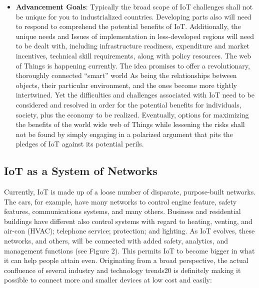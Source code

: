\begin{itemize}
 \item \textbf{Advancement Goals}: Typically the broad scope of IoT challenges shall not be unique for you to industrialized countries. Developing parts also will need to respond to comprehend the potential benefits of IoT. Additionally, the unique needs and
 Issues of implementation in less-developed regions will need to be dealt with, including infrastructure readiness, expenditure and market incentives, technical skill requirements, along with policy resources.
The web of Things is happening currently. The idea promises to offer a revolutionary, thoroughly connected “smart” world As being the relationships between objects, their particular environment, and the ones become more tightly intertwined. Yet the difficulties and challenges associated with IoT need to be considered and resolved in order for the potential benefits for individuals, society, plus the economy to be realized. Eventually, options for maximizing the benefits of the world wide web of Things while lessening the risks shall not be found by simply engaging in a polarized argument that pits the pledges of IoT against its potential perils.

\end{itemize}

\subsection{IoT as a System of Networks}
Currently, IoT is made up of a loose number of disparate, purpose-built networks. The cars, for example, have many networks to control engine feature, safety features, communications systems, and many others. Business and residential buildings have different also control systems with regard to heating, venting, and air-con (HVAC); telephone service; protection; and lighting. As IoT evolves, these networks, and others, will be connected with added safety, analytics, and management functions (see Figure 2). This permits IoT to become bigger in what it can help people attain even.
Originating from a broad perspective, the actual confluence of several industry and technology trends20 is definitely making it possible to connect more and smaller devices at low cost and easily:

